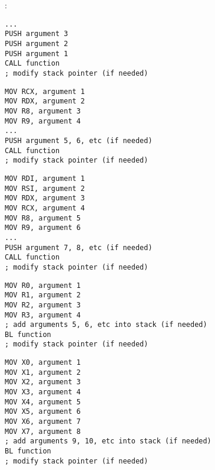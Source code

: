 \chapter{\PrintfSeveralArgumentsSectionName}









\section{\Conclusion{}}

:

\begin{lstlisting}[caption=x86]
...
PUSH argument 3
PUSH argument 2
PUSH argument 1
CALL function
; modify stack pointer (if needed)
\end{lstlisting}

\begin{lstlisting}[caption=x64 (MSVC)]
MOV RCX, argument 1
MOV RDX, argument 2
MOV R8, argument 3
MOV R9, argument 4
...
PUSH argument 5, 6, etc (if needed)
CALL function
; modify stack pointer (if needed)
\end{lstlisting}

\begin{lstlisting}[caption=x64 (GCC)]
MOV RDI, argument 1
MOV RSI, argument 2
MOV RDX, argument 3
MOV RCX, argument 4
MOV R8, argument 5
MOV R9, argument 6
...
PUSH argument 7, 8, etc (if needed)
CALL function
; modify stack pointer (if needed)
\end{lstlisting}

\begin{lstlisting}[caption=ARM]
MOV R0, argument 1
MOV R1, argument 2
MOV R2, argument 3
MOV R3, argument 4
; add arguments 5, 6, etc into stack (if needed)
BL function
; modify stack pointer (if needed)
\end{lstlisting}

\begin{lstlisting}[caption=ARM64]
MOV X0, argument 1
MOV X1, argument 2
MOV X2, argument 3
MOV X3, argument 4
MOV X4, argument 5
MOV X5, argument 6
MOV X6, argument 7
MOV X7, argument 8
; add arguments 9, 10, etc into stack (if needed)
BL function
; modify stack pointer (if needed)
\end{lstlisting}

